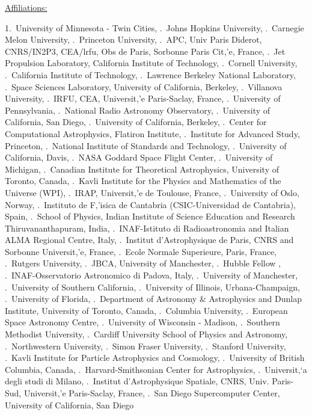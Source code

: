 \documentclass[17pt]{extarticle}
\begin{document}
\normalsize \underline{Affiliations:}
%
\raggedright
\footnotesize {
1.~University of Minnesota - Twin Cities, .~Johns Hopkins University, .~Carnegie Melon University, .~Princeton University, .~APC, Univ Paris Diderot, CNRS/IN2P3, CEA/lrfu, Obs de Paris, Sorbonne Paris Cit,'e, France, .~Jet Propulsion Laboratory, California Institute of Technology, .~Cornell University, .~California Institute of Technology, .~Lawrence Berkeley National Laboratory, .~Space Sciences Laboratory, University of California, Berkeley, .~Villanova University, .~IRFU, CEA, Universit,'e Paris-Saclay, France, .~University of Pennsylvania, .~National Radio Astronomy Observatory, .~University of California, San Diego, .~University of California, Berkeley, .~Center for Computational Astrophysics, Flatiron Institute, .~Institute for Advanced Study, Princeton, .~National Institute of Standards and Technology, .~University of California, Davis, .~NASA Goddard Space Flight Center, .~University of Michigan, .~Canadian Institute for Theoretical Astrophysics, University of Toronto, Canada, .~Kavli Institute for the Physics and Mathematics of the Universe (WPI), .~IRAP, Universit,'e de Toulouse, France, .~University of Oslo, Norway, .~Instituto de F,'isica de Cantabria (CSIC-Universidad de Cantabria), Spain, .~School of Physics, Indian Institute of Science Education and Research Thiruvananthapuram, India, .~INAF-Istituto di Radioastronomia and Italian ALMA Regional Centre, Italy, .~Institut d'Astrophysique de Paris, CNRS and Sorbonne Universit,'e, France, .~Ecole Normale Superieure, Paris, France, .~Rutgers University, .~JBCA, University of Manchester, .~Hubble Fellow          , .~INAF-Osservatorio Astronomico di Padova, Italy, .~University of Manchester, .~University of Southern California, .~University of Illinois, Urbana-Champaign, .~University of Florida, .~Department of Astronomy \& Astrophysics and Dunlap Institute, University of Toronto, Canada, .~Columbia University, .~European Space Astronomy Centre, .~University of Wisconsin - Madison, .~Southern Methodist University, .~Cardiff University School of Physics and Astronomy, .~Northwestern University, .~Simon Fraser University, .~Stanford University, .~Kavli Institute for Particle Astrophysics and Cosmology, .~University of British Columbia, Canada, .~Harvard-Smithsonian Center for Astrophysics, .~Universit,`a degli studi di Milano, .~Institut d'Astrophysique Spatiale, CNRS, Univ. Paris-Sud, Universit,'e Paris-Saclay, France, .~San Diego Supercomputer Center, University of California, San Diego
}
\end{document}
